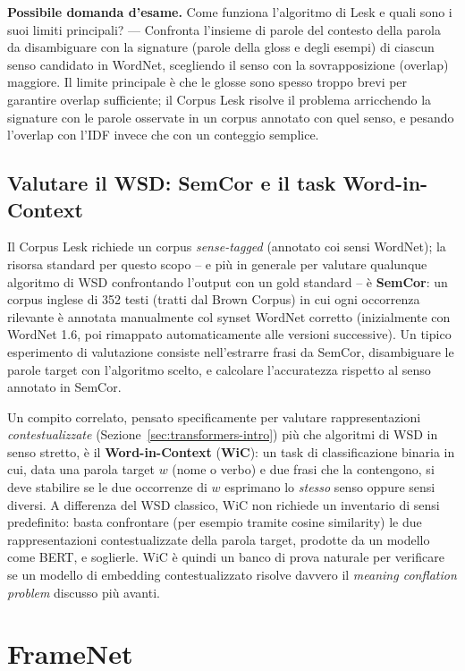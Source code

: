 \documentclass[11pt,a4paper]{report}
\newcommand{\domandaesame}[1]{\begin{esame}\textbf{Possibile domanda d'esame.} #1\end{esame}}
\begin{document}
\domandaesame{Come funziona l'algoritmo di Lesk e quali sono i suoi limiti principali? --- Confronta l'insieme di parole del contesto della parola da disambiguare con la signature (parole della gloss e degli esempi) di ciascun senso candidato in WordNet, scegliendo il senso con la sovrapposizione (overlap) maggiore. Il limite principale è che le glosse sono spesso troppo brevi per garantire overlap sufficiente; il Corpus Lesk risolve il problema arricchendo la signature con le parole osservate in un corpus annotato con quel senso, e pesando l'overlap con l'IDF invece che con un conteggio semplice.}

\subsection{Valutare il WSD: SemCor e il task Word-in-Context}
\label{sec:semcor-wic}

Il Corpus Lesk richiede un corpus \emph{sense-tagged} (annotato coi sensi WordNet); la risorsa standard per questo scopo -- e più in generale per valutare qualunque algoritmo di WSD confrontando l'output con un gold standard -- è \textbf{SemCor}: un corpus inglese di 352 testi (tratti dal Brown Corpus) in cui ogni occorrenza rilevante è annotata manualmente col synset WordNet corretto (inizialmente con WordNet 1.6, poi rimappato automaticamente alle versioni successive). Un tipico esperimento di valutazione consiste nell'estrarre frasi da SemCor, disambiguare le parole target con l'algoritmo scelto, e calcolare l'accuratezza rispetto al senso annotato in SemCor.

Un compito correlato, pensato specificamente per valutare rappresentazioni \emph{contestualizzate} (Sezione~\ref{sec:transformers-intro}) più che algoritmi di WSD in senso stretto, è il \textbf{Word-in-Context} (\textbf{WiC}): un task di classificazione binaria in cui, data una parola target $w$ (nome o verbo) e due frasi che la contengono, si deve stabilire se le due occorrenze di $w$ esprimano lo \emph{stesso} senso oppure sensi diversi. A differenza del WSD classico, WiC non richiede un inventario di sensi predefinito: basta confrontare (per esempio tramite cosine similarity) le due rappresentazioni contestualizzate della parola target, prodotte da un modello come BERT, e soglierle. WiC è quindi un banco di prova naturale per verificare se un modello di embedding contestualizzato risolve davvero il \emph{meaning conflation problem} discusso più avanti.

\section{FrameNet}
\end{document}
